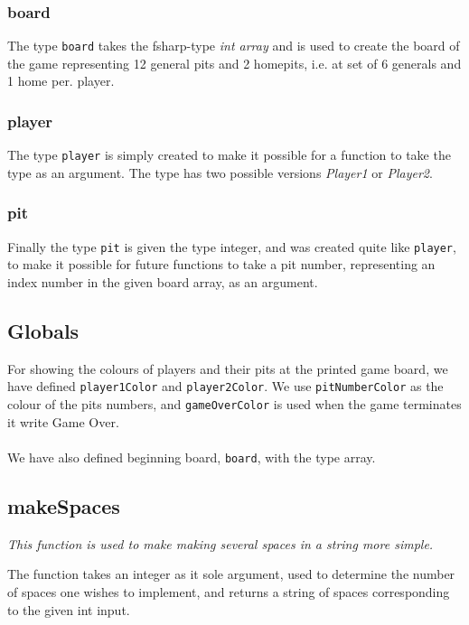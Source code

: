 \documentclass[a4paper]{report}
\begin{document}


\subsubsection*{board}
The type \texttt{board} takes the fsharp-type \textsl{int array} and is used to create the board of the game representing 12 general pits and 2 homepits, i.e. at set of 6 generals and 1 home per. player.

\subsubsection*{player}
The type \texttt{player} is simply created to make it possible for a function to take the type as an argument. The type has two possible versions \textsl{Player1} or \textsl{Player2}.

\subsubsection*{pit}
Finally the type \texttt{pit} is given the type integer, and was created quite like \texttt{player}, to make it possible for future functions to take a pit number, representing an index number in the given board array, as an argument.

\subsection*{Globals}
For showing the colours of players and their pits at the printed game board, we have defined \texttt{player1Color} and \texttt{player2Color}. We use \texttt{pitNumberColor} as the colour of the pits numbers, and \texttt{gameOverColor} is used when the game terminates it write Game Over.
\\\\
We have also defined beginning board, \texttt{board}, with the type array.

\subsection*{makeSpaces}
{\it This function is used to make making several spaces in a string more simple.}

The function takes an integer as it sole argument, used to determine the number of spaces one wishes to implement, and returns a string of spaces corresponding to the given int input.
\end{document}
